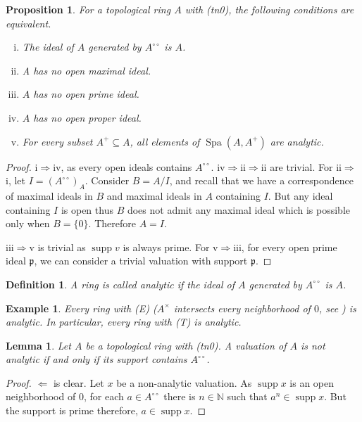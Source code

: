 \documentclass[8pt]{article}
\numberwithin{equation}{section}
\newtheorem{proposition}{Proposition}[subsection]
\newtheorem{definition}{Definition}[subsection]
\newtheorem{lemma}{Lemma}[subsection]
\newtheorem{example}{Example}[subsection]
\DeclareMathOperator{\supp}{supp}
\DeclareMathOperator{\Spa}{Spa}
\newcommand{\N}[0]{\mathbb{N}}
\newcommand{\p}[0]{\mathfrak{p}}
\newcommand{\dcirc}[0]{{\circ\circ}}
\begin{document}
\begin{proposition}
    \label{fact_15_14} For a topological ring $A$ with (tn0), the following conditions are equivalent.
    \begin{enumerate}[i.]
        \item The ideal of $A$ generated by $A^\dcirc$ is $A$.
        \item A has no open maximal ideal.
        \item $A$ has no open prime ideal.
        \item $A$ has no open proper ideal.
        \item For every subset $A^+\subseteq A$, all elements of $\Spa(A,A^+)$ are analytic.
    \end{enumerate}
\end{proposition}
\begin{proof}
    i$\Rightarrow$iv, as every open ideals contains $A^\dcirc$. iv$\Rightarrow$ii$\Rightarrow$ii are trivial.
    For ii$\Rightarrow$i, let $I= (A^\dcirc)_A$. Consider $B=A/I$, and recall that we have a correspondence of maximal ideals in $B$ and maximal ideals in $A$ containing $I$. But any ideal containing $I$ is open thus $B$ does not admit any maximal ideal which is possible only when $B=\{0\}$. Therefore $A=I$.%
    \par iii$\Rightarrow$v is trivial as $\supp v$ is always prime. For v$\Rightarrow $iii, for every open prime ideal $\p$, we can consider a trivial valuation with support $\p$.%
\end{proof}
\begin{definition}
    A ring is called analytic if the ideal of $A$ generated by $A^\dcirc$ is $A$.
\end{definition}
\begin{example}
    Every ring with (E) ($A^\times$ intersects every neighborhood of $0$, see ) is analytic. In particular, every ring with (T) is analytic.
\end{example}

\begin{lemma}
    \label{lemma_15_15_1}
    Let $A$ be a topological ring with (tn0). A valuation of $A$ is not analytic if and only if its support contains $A^\dcirc$.
\end{lemma}
\begin{proof}
    $\Leftarrow$ is clear. Let $x$ be a non-analytic valuation. As $\supp x$ is an open neighborhood of $0$, for each $a\in A^\dcirc$ there is $n\in\N$ such that $a^n\in\supp x$. But the support is prime therefore, $a\in\supp x$.
\end{proof}
\end{document}
